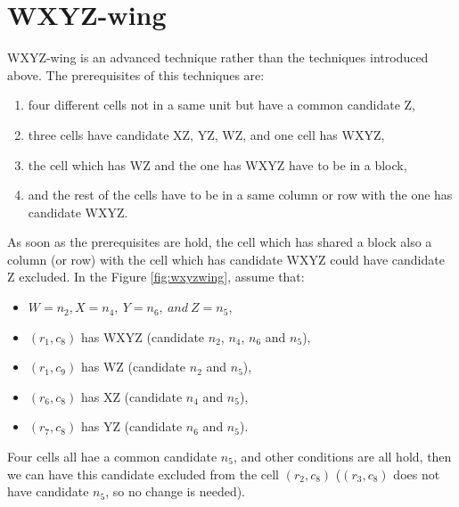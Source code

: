 \documentclass[11pt]{report}
\begin{document}
\section{WXYZ-wing}
\label{sec:WXYZ-wing}
WXYZ-wing is an advanced technique rather than the techniques introduced above. The prerequisites of this techniques are:
\begin{enumerate}
\item four different cells not in a same unit but have a common candidate Z,
\item three cells have candidate XZ, YZ, WZ, and one cell has WXYZ,
\item the cell which has WZ and the one has WXYZ have to be in a block,
\item and the rest of the cells have to be in a same column or row with the one has candidate WXYZ.
\end{enumerate}
As soon as the prerequisites are hold, the cell which has shared a block also a column (or row) with the cell which has candidate WXYZ could have candidate Z excluded.
In the Figure \ref{fig:wxyzwing}, assume that:
\begin{itemize}
\item $W= n_{2}, X = n_{4},\ Y = n_{6},\ and\ Z = n_{5}$,
\item $(r_{1}, c_{8})$ has WXYZ (candidate $n_{2}$, $n_{4}$, $n_{6}$ and $n_{5}$),
\item $(r_{1}, c_{9})$ has WZ (candidate $n_{2}$ and $n_{5}$),
\item $(r_{6}, c_{8})$ has XZ (candidate $n_{4}$ and $n_{5}$),
\item $(r_{7}, c_{8})$ has YZ (candidate $n_{6}$ and $n_{5}$).
\end{itemize}
Four cells all hae a common candidate $n_{5}$, and other conditions are all hold, then we can have this candidate excluded from the cell $(r_{2}, c_{8})$ ($(r_{3}, c_{8})$ does not have candidate $n_{5}$, so no change is needed).
\end{document}
